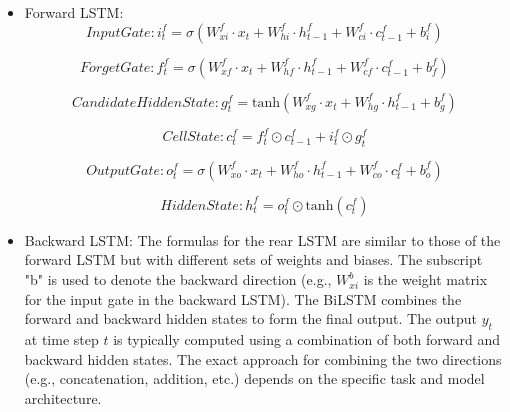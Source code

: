\documentclass[a4paper, fleqn]{cas-sc}
\theoremstyle{definition}
\theoremstyle{remark}
\begin{document}
\begin{itemize}
  \item  Forward LSTM: \\

    \begin{equation} \label{bi i}
      Input Gate :  i_t^f = \sigma(W_{xi}^f \cdot x_t + W_{hi}^f \cdot h_{t-1}^f + W_{ci}^f \cdot c_{t-1}^f + b_i^f)
    \end{equation}

    \begin{equation}
      Forget Gate :  f_t^f = \sigma(W_{xf}^f \cdot x_t + W_{hf}^f \cdot h_{t-1}^f + W_{cf}^f \cdot c_{t-1}^f + b_f^f) 
    \end{equation}

    \begin{equation}
      Candidate Hidden State :   g_t^f = \text{tanh}(W_{xg}^f \cdot x_t + W_{hg}^f \cdot h_{t-1}^f + b_g^f)
    \end{equation}

    \begin{equation}
      Cell State :  c_t^f = f_t^f \odot c_{t-1}^f + i_t^f \odot g_t^f
    \end{equation}

    \begin{equation}
      Output Gate :  o_t^f = \sigma(W_{xo}^f \cdot x_t + W_{ho}^f \cdot h_{t-1}^f + W_{co}^f \cdot c_t^f + b_o^f)
    \end{equation}

    \begin{equation} \label{bi h}
      Hidden State :   h_t^f = o_t^f \odot \text{tanh}(c_t^f) 
    \end{equation}

  \item Backward LSTM: 
  The formulas for the rear LSTM are similar to those of the forward LSTM but with different sets of weights and biases. The subscript "b" is used to denote the backward direction (e.g.,  \(W_{xi}^b\) is the weight matrix for the input gate in the backward LSTM). The BiLSTM combines the forward and backward hidden states to form the final output. The output \(y_t\) at time step \(t\) is typically computed using a combination of both forward and backward hidden states. The exact approach for combining the two directions (e.g.,  concatenation,  addition,  etc.) depends on the specific task and model architecture.
\end{itemize}
\end{document}
